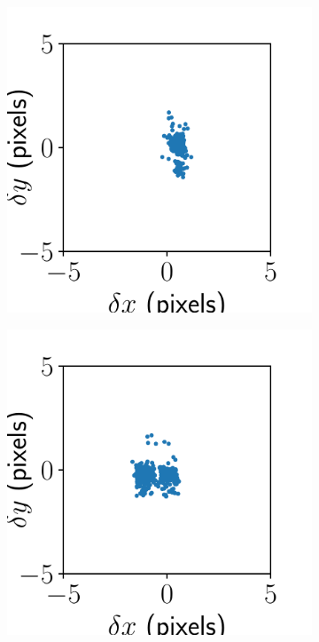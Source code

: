 \documentclass{article}
\begin{document}
\begin{figure}[ht]
\begin{subfigure}{0.24\linewidth}
		\caption{}
		\label{fig:alignmentresultAKY3}
	\end{subfigure}
	\begin{subfigure}{0.24\linewidth}
		\includegraphics[width=\linewidth]{alignment-result-AKY-2.pdf}
		\caption{}
		\label{fig:alignmentresultAKY2}
	\end{subfigure}
	\begin{subfigure}{0.24\linewidth}
		\includegraphics[width=\linewidth]{alignment-result-AKY-1.pdf}

\end{subfigure}
\end{figure}
\end{document}
